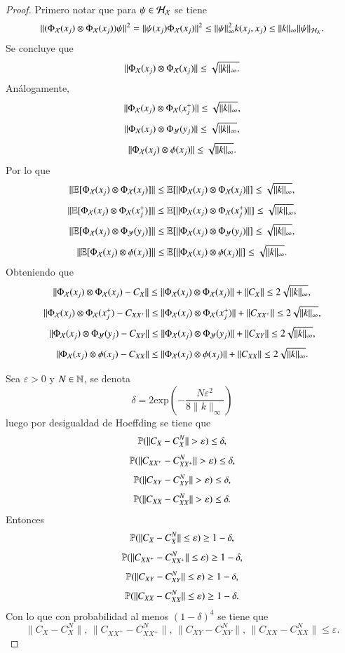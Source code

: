 \begin{proof}
        Primero notar que para $\psi \in \H_\X$ se tiene
    \[
    \| (\Phi_\X (x_j) \otimes \Phi_\X (x_j))\psi \|^2 = \| \psi(x_j) \Phi_\X (x_j) \|^2 \leq \| \psi \|_\infty^2 k(x_j, x_j) \leq \| k \|_\infty \| \psi \|_{\H_\X}.
    \]
    Se concluye que
    \[ \| \Phi_\X (x_j) \otimes \Phi_\X (x_j) \| \leq  \sqrt{\| k \|_\infty.} \] 
    Análogamente,
    \[
    \| \Phi_\X (x_j) \otimes \Phi_\X (x_j^+) \| \leq \sqrt{\| k \|_\infty},
    \]
     \[
    \| \Phi_\X (x_j) \otimes \Phi_\Y (y_j) \| \leq \sqrt{\| k \|_\infty},
    \]
     \[
    \| \Phi_\X (x_j) \otimes \phi (x_j) \| \leq \sqrt{\| k \|_\infty}.
    \]
    Por lo que
    \[ \| \E[ \Phi_\X (x_j) \otimes \Phi_\X (x_j)] \| \leq  \E[ \| \Phi_\X (x_j) \otimes \Phi_\X (x_j) \| ] \leq \sqrt{\| k \|_\infty}, \] 
    \[
    \| \E[ \Phi_\X (x_j) \otimes \Phi_\X (x_j^+)] \| \leq \E[ \| \Phi_\X (x_j) \otimes \Phi_\X (x_j^+)\|]  \leq \sqrt{\| k \|_\infty},
    \]
     \[
    \| \E [\Phi_\X (x_j) \otimes \Phi_\Y (y_j)] \| \leq \E [\| \Phi_\X (x_j) \otimes \Phi_\Y (y_j) \|]  \leq \sqrt{\| k \|_\infty},
    \]
     \[ \| \E[ \Phi_\X (x_j) \otimes \phi (x_j)] \| \leq  \E[ \| \Phi_\X (x_j) \otimes \phi (x_j) \| ] \leq \sqrt{\| k \|_\infty}. \] 
     Obteniendo que
     \[
     \| \Phi_\X (x_j) \otimes \Phi_\X (x_j) - C_X \| \leq \| \Phi_\X (x_j) \otimes \Phi_\X (x_j) \| + \| C_X \| \leq 2 \sqrt{\| k \|_\infty},
     \]
     \[
     \| \Phi_\X (x_j) \otimes \Phi_\X (x_j^+) - C_{XX^+} \| \leq \| \Phi_\X (x_j) \otimes \Phi_\X (x_j^+) \| + \| C_{XX^+} \| \leq 2 \sqrt{\| k \|_\infty},
     \]
     \[
     \| \Phi_\X (x_j) \otimes \Phi_\Y (y_j) - C_{XY} \| \leq \| \Phi_\X (x_j) \otimes \Phi_\Y (y_j) \| + \| C_{XY} \| \leq 2 \sqrt{\| k \|_\infty},
     \]
    \[
     \| \Phi_\X (x_j) \otimes \phi (x_j) - C_{XX} \| \leq \| \Phi_\X (x_j) \otimes \phi (x_j) \| + \| C_{XX} \| \leq 2 \sqrt{\| k \|_\infty}.
     \]

     Sea $\varepsilon > 0$ y $N \in \N$, se denota
     \[
     \delta = 2 \text{exp} \left ( - \frac{N \varepsilon^2}{8 \| k \|_\infty} \right )
     \]
     luego por desigualdad de Hoeffding se tiene que
    \[
    \P ( \| C_{X} - C_{X}^N \| > \varepsilon ) \leq \delta,
    \]
    \[
    \P ( \| C_{XX^+} - C_{XX^+}^N \| > \varepsilon ) \leq \delta,
    \]
    \[
    \P ( \| C_{XY} - C_{XY}^N \| > \varepsilon ) \leq \delta,
    \]
    \[
    \P ( \| C_{XX} - C_{XX}^N \| > \varepsilon ) \leq \delta.
    \]
    Entonces
    \[
    \P ( \| C_{X} - C_{X}^N \| \leq \varepsilon ) \geq 1-\delta,
    \]
    \[
    \P ( \| C_{XX^+} - C_{XX^+}^N \| \leq \varepsilon ) \geq 1-\delta,
    \]
    \[
    \P ( \| C_{XY} - C_{XY}^N \| \leq \varepsilon ) \geq 1-\delta,
    \]
    \[
    \P ( \| C_{XX} - C_{XX}^N \| \leq \varepsilon ) \geq 1-\delta.
    \]
    Con lo que con probabilidad al menos $(1-\delta)^4$ se tiene que
    \[
    \| C_{X} - C_{X}^N \|, \, \| C_{XX^+} - C_{XX^+}^N \|, \, \| C_{XY} - C_{XY}^N \|, \, \| C_{XX} - C_{XX}^N \| \leq \varepsilon.
    \]
\end{proof}

